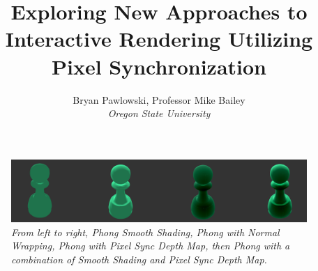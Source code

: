 \documentclass{article}
\title{\fontfamily{phv}\textbf{Exploring New Approaches to Interactive Rendering Utilizing Pixel Synchronization}}
\author{Bryan Pawlowski, Professor Mike Bailey \\ \textit{Oregon State University}\vspace{-2ex}}
\date{\vspace{-5ex}}
\begin{document}
\vspace{-3ex}
\maketitle
{}
\begin{figure}[H]
	\centering
	\includegraphics[width=1.0\textwidth]{Result.png}
	\caption{\textit{From left to right, Phong Smooth Shading, Phong with Normal Wrapping, Phong with Pixel Sync Depth Map, then Phong with a combination of Smooth Shading and Pixel Sync Depth Map.}}
	\label{fig: ResultPhotos}
\end{figure}
\end{document}
